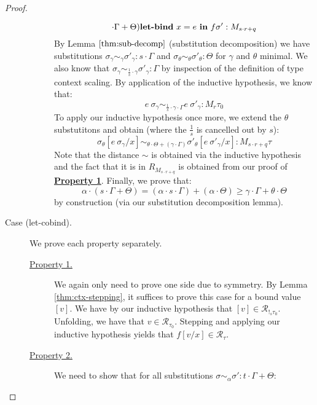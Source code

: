 \begin{proof}
\begin{description}
\begin{description}
$${          \cdot \Gamma + \Theta)} \textbf{let-bind}~x = e \ \textbf{in} \ f \sigma' :
          M_{s \cdot r + q}$$
          By Lemma $\ref{thm:sub-decomp}$ (substitution decomposition) we have
          substitutions 
          $\sigma_{\gamma} \sim_{\gamma} \sigma'_{\gamma} : s \cdot \Gamma$
          and $\sigma_{\theta} \sim_{\theta} \sigma'_{\theta} : \Theta$ for
          $\gamma$ and $\theta$ minimal. 
          We also know that 
          $\sigma_{\gamma} \sim_{\frac{1}{s} \cdot \gamma} \sigma'_{\gamma} : \Gamma$ by
          inspection of the definition of type context scaling.
          By application of the inductive hypothesis, we know that:
          $$
          e~\sigma_{\gamma} \sim_{\frac{1}{s} \cdot \gamma \cdot \Gamma}
          e~\sigma'_{\gamma} : M_r \tau_0
          $$
          To apply our inductive hypothesis once more, we extend the $\theta$
          substutitons and obtain (where the $\frac{1}{s}$ is cancelled out by
          $s$):
          $$\sigma_{\theta}[e~\sigma_{\gamma}/x] \sim_{\theta \cdot \Theta + (\gamma \cdot \Gamma)}\sigma'_{\theta}[e~\sigma'_{\gamma}/x] : M_{s \cdot r + q} \tau$$
          Note that the distance $\sim$ is obtained via the inductive hypothesis
          and the fact that it is in $R_{M_{s \cdot r + q}}$ is obtained from
          our proof of \textbf{\underline{Property 1}}.
          Finally, we prove that:
          $$
          \alpha \cdot (s \cdot \Gamma + \Theta) = 
          (\alpha \cdot s \cdot \Gamma) + (\alpha \cdot \Theta)
          \geq
          \gamma \cdot \Gamma + \theta \cdot \Theta
          $$
          by construction (via our substitution decomposition lemma).
      \end{description}
    \item[Case (let-cobind).] 
      We prove each property separately.
      \begin{description}
        \item[\underline{Property 1.}]
          We again only need to prove one side due to symmetry.
          By Lemma \ref{thm:ctx-stepping}, it suffices to prove this case for a
          bound value $[v]$. 
          We have by our inductive hypothesis that $[v] \in \mathcal{R}_{!_s \tau_0}$.
          Unfolding, we have that $v \in \mathcal{R}_{\tau_0}$.
          Stepping and applying our inductive hypothesis yields that $f[v/x] \in
          \mathcal{R}_{\tau}$.
        \item[\underline{Property 2.}]
          We need to show that for all substitutions $\sigma \sim_{\alpha}
          \sigma' : t \cdot \Gamma + \Theta$:

\end{description}
\end{description}
\end{proof}
